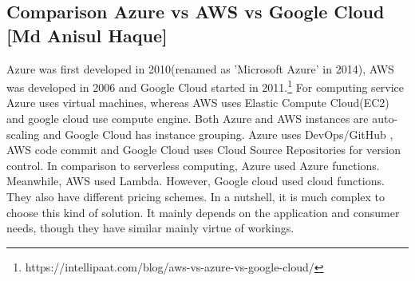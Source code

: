 %
\subsection{Comparison Azure vs AWS vs Google Cloud [Md Anisul Haque]}
%

Azure was first developed in 2010(renamed as 'Microsoft Azure' in 2014), AWS was developed in 2006 and Google Cloud started in 2011.\footnote{https://intellipaat.com/blog/aws-vs-azure-vs-google-cloud/} For computing service Azure uses virtual machines, whereas AWS uses Elastic Compute Cloud(EC2) and google cloud use compute engine. Both Azure and AWS instances are auto-scaling and Google Cloud has instance grouping\cite{articleComparison}. Azure uses DevOps/GitHub , AWS code commit and Google Cloud uses Cloud Source Repositories for version control. In comparison to serverless computing, Azure used Azure functions.
Meanwhile, AWS used Lambda. However, Google cloud used cloud functions. They also have different pricing schemes. In a nutshell, it is much complex to choose this kind of solution. It mainly depends on the application and consumer needs, though they have similar mainly virtue of workings.  

